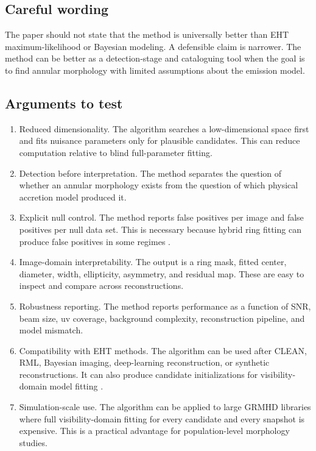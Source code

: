 \documentclass[11pt]{article}
\begin{document}
\subsection{Careful wording}
The paper should not state that the method is universally better than EHT maximum-likelihood or Bayesian modeling. A defensible claim is narrower. The method can be better as a detection-stage and cataloguing tool when the goal is to find annular morphology with limited assumptions about the emission model.

\subsection{Arguments to test}
\begin{enumerate}[leftmargin=*]
    \item Reduced dimensionality. The algorithm searches a low-dimensional space first and fits nuisance parameters only for plausible candidates. This can reduce computation relative to blind full-parameter fitting.
    \item Detection before interpretation. The method separates the question of whether an annular morphology exists from the question of which physical accretion model produced it.
    \item Explicit null control. The method reports false positives per image and false positives per null data set. This is necessary because hybrid ring fitting can produce false positives in some regimes \citep{TiedeNgEHT2022}.
    \item Image-domain interpretability. The output is a ring mask, fitted center, diameter, width, ellipticity, asymmetry, and residual map. These are easy to inspect and compare across reconstructions.
    \item Robustness reporting. The method reports performance as a function of SNR, beam size, uv coverage, background complexity, reconstruction pipeline, and model mismatch.
    \item Compatibility with EHT methods. The algorithm can be used after CLEAN, RML, Bayesian imaging, deep-learning reconstruction, or synthetic reconstructions. It can also produce candidate initializations for visibility-domain model fitting \citep{Hogbom1974,Chael2018,Bouman2016,Lai2025}.
    \item Simulation-scale use. The algorithm can be applied to large GRMHD libraries where full visibility-domain fitting for every candidate and every snapshot is expensive. This is a practical advantage for population-level morphology studies.
\end{enumerate}
\end{document}
